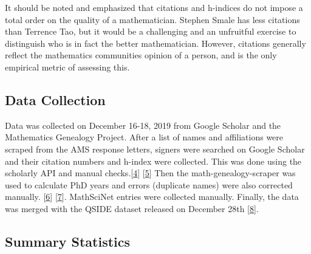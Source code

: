 \documentclass[]{article}
\begin{document}
It should be noted and emphasized that citations and h-indices do not
impose a total order on the quality of a mathematician. Stephen Smale
has less citations than Terrence Tao, but it would be a challenging and
an unfruitful exercise to distinguish who is in fact the better
mathematician. However, citations generally reflect the mathematics
communities opinion of a person, and is the only empirical metric of
assessing this.

\hypertarget{data-collection}{%
\subsection{Data Collection}\label{data-collection}}

Data was collected on December 16-18, 2019 from Google Scholar and the
Mathematics Genealogy Project. After a list of names and affiliations
were scraped from the AMS response letters, signers were searched on
Google Scholar and their citation numbers and h-index were collected.
This was done using the scholarly API and manual
checks.{[}\protect\hyperlink{Bibliography}{4}{]}
{[}\protect\hyperlink{Bibliography}{5}{]} Then the
math-genealogy-scraper was used to calculate PhD years and errors
(duplicate names) were also corrected manually.
{[}\protect\hyperlink{Bibliography}{6}{]}
{[}\protect\hyperlink{Bibliography}{7}{]}. MathSciNet entries were
collected manually. Finally, the data was merged with the QSIDE dataset
released on December 28th {[}\protect\hyperlink{Bibliography}{8}{]}.

\hypertarget{summary-statistics}{%
\subsection{Summary Statistics}\label{summary-statistics}}
\end{document}
